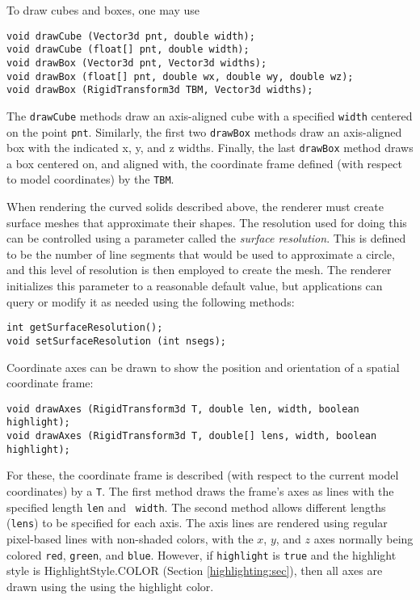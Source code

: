 To draw cubes and boxes, one may use
%
\begin{lstlisting}[]
void drawCube (Vector3d pnt, double width);
void drawCube (float[] pnt, double width);
void drawBox (Vector3d pnt, Vector3d widths);
void drawBox (float[] pnt, double wx, double wy, double wz);
void drawBox (RigidTransform3d TBM, Vector3d widths);
\end{lstlisting}
%
The {\tt drawCube} methods draw an axis-aligned cube with a specified
{\tt width} centered on the point {\tt pnt}. Similarly, the first two
{\tt drawBox} methods draw an axis-aligned box with the indicated x,
y, and z widths. Finally, the last {\tt drawBox} method draws a box
centered on, and aligned with, the coordinate frame defined (with
respect to model coordinates) by the 
 {\tt TBM}.

When rendering the curved solids described above, the renderer must
create surface meshes that approximate their shapes. The resolution
used for doing this can be controlled using a parameter called the
{\it surface resolution}. This is defined to be the number of line
segments that would be used to approximate a circle, and this level of
resolution is then employed to create the mesh. The renderer
initializes this parameter to a reasonable default value, but
applications can query or modify it as needed using the following
methods:
%
\begin{lstlisting}[]
int getSurfaceResolution();
void setSurfaceResolution (int nsegs);
\end{lstlisting}
%

Coordinate axes can be drawn to show the position and orientation of a
spatial coordinate frame:
%
\begin{lstlisting}[]
void drawAxes (RigidTransform3d T, double len, width, boolean highlight);
void drawAxes (RigidTransform3d T, double[] lens, width, boolean highlight);
\end{lstlisting}
%
For these, the coordinate frame is described (with respect to the current
model coordinates) by a 
 {\tt T}. The first method
draws the frame's axes
as lines with the specified length {\tt len} and {\tt
width}. The second method allows different lengths ({\tt lens}) to be
specified for each axis. The axis lines are rendered using regular
pixel-based lines with non-shaded colors, with the $x$, $y$, and $z$
axes normally being colored {\tt red}, {\tt green}, and {\tt blue}.
However, if {\tt highlight} is {\tt true} and the highlight
style is 
%
{HighlightStyle.COLOR}
(Section \ref{highlighting:sec}), then all axes are drawn
using the using the highlight color.


